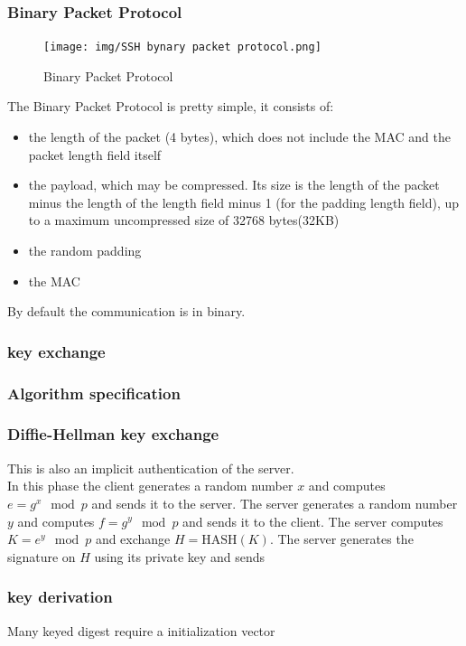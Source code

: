 \subsubsection{Binary Packet Protocol}
\begin{figure}[H]
  \centering
  \texttt{[image: img/SSH bynary packet
  protocol.png]}
  \caption{Binary Packet Protocol}
\end{figure}
The Binary Packet Protocol is pretty simple, it consists of:
\begin{itemize}
  \item the length of the packet (4 bytes), which does not include the
    MAC and the packet length field itself
  \item the payload, which may be compressed. Its size is the length
    of the packet minus the length of the length field minus 1 (for
    the padding length field), up to a maximum uncompressed size of
    32768 bytes(32KB)
  \item the random padding
  \item the MAC
\end{itemize}

By default the communication is in binary.

\subsubsection{key exchange}
\subsubsection{Algorithm specification}
\subsubsection{Diffie-Hellman key exchange}
This is also an implicit authentication of the server.\\
In this phase the client generates a random number $x$ and computes
$e=g^x \mod p$ and sends it to the server. The server generates a
random number $y$ and computes $f=g^y \mod p$ and sends it to the
client. The server computes $K=e^y \mod p$ and exchange
$H=\text{HASH}(K)$. The server generates the signature on $H$ using
its private key and sends 

\subsubsection{key derivation}
Many keyed digest require a initialization vector

